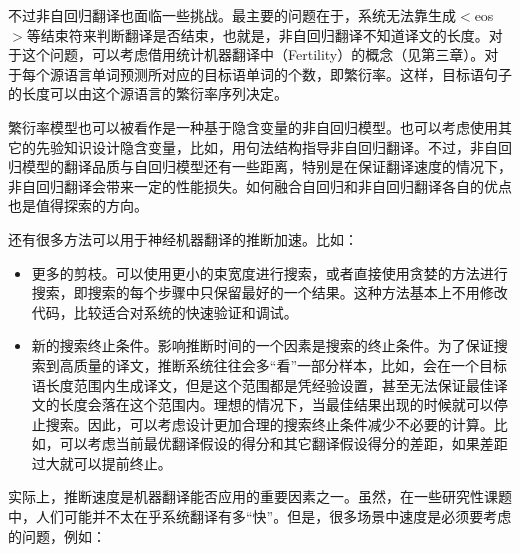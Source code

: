 \parinterval 不过非自回归翻译也面临一些挑战。最主要的问题在于，系统无法靠生成$<$eos$>$等结束符来判断翻译是否结束，也就是，非自回归翻译不知道译文的长度。对于这个问题，可以考虑借用统计机器翻译中{\small{}}（Fertility）的概念（见第三章）。对于每个源语言单词预测所对应的目标语单词的个数，即繁衍率。这样，目标语句子的长度可以由这个源语言的繁衍率序列决定。

\parinterval 繁衍率模型也可以被看作是一种基于隐含变量的非自回归模型。也可以考虑使用其它的先验知识设计隐含变量，比如，用句法结构指导非自回归翻译\cite{Gu2017NonAutoregressiveNM}。不过，非自回归模型的翻译品质与自回归模型还有一些距离，特别是在保证翻译速度的情况下，非自回归翻译会带来一定的性能损失。如何融合自回归和非自回归翻译各自的优点也是值得探索的方向。

\vspace{0.5em}
\vspace{0.5em}

\parinterval 还有很多方法可以用于神经机器翻译的推断加速。比如：

\begin{itemize}
\vspace{0.5em}
\item 更多的剪枝。可以使用更小的束宽度进行搜索，或者直接使用贪婪的方法进行搜索，即搜索的每个步骤中只保留最好的一个结果。这种方法基本上不用修改代码，比较适合对系统的快速验证和调试。
\vspace{0.5em}
\item 新的搜索终止条件。影响推断时间的一个因素是搜索的终止条件。为了保证搜索到高质量的译文，推断系统往往会多``看''一部分样本，比如，会在一个目标语长度范围内生成译文，但是这个范围都是凭经验设置，甚至无法保证最佳译文的长度会落在这个范围内。理想的情况下，当最佳结果出现的时候就可以停止搜索。因此，可以考虑设计更加合理的搜索终止条件减少不必要的计算\cite{DBLP:conf/emnlp/HuangZM17}。比如，可以考虑当前最优翻译假设的得分和其它翻译假设得分的差距，如果差距过大就可以提前终止。
\vspace{0.5em}
\end{itemize}

\parinterval 实际上，推断速度是机器翻译能否应用的重要因素之一。虽然，在一些研究性课题中，人们可能并不太在乎系统翻译有多``快''。但是，很多场景中速度是必须要考虑的问题，例如：

